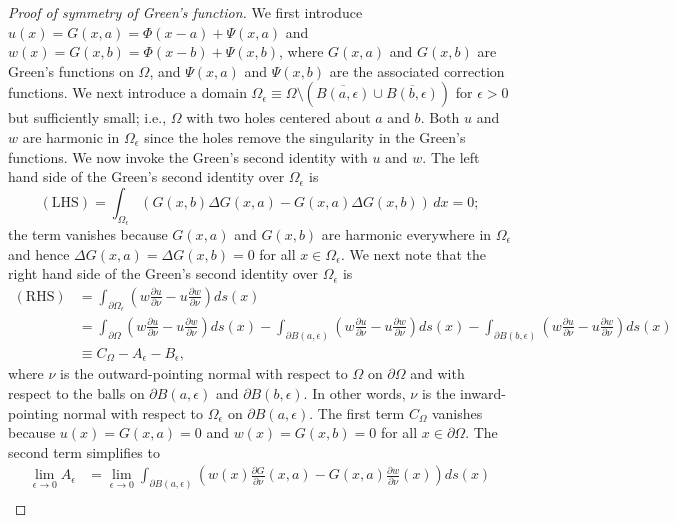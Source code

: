 \begin{proof}[Proof of symmetry of Green's function]
    We first introduce $u(x) = G(x, a) = \Phi(x - a) + \Psi(x, a)$ and $w(x) = G(x, b) = \Phi(x - b) + \Psi(x, b)$, where $G(x, a)$ and $G(x, b)$ are Green's functions on $\Omega$, and $\Psi(x, a)$ and $\Psi(x, b)$ are the associated correction functions. We next introduce a domain $\Omega_\epsilon \equiv \Omega \setminus (\overline{B(a, \epsilon)} \cup \overline{B(b, \epsilon)})$ for $\epsilon > 0$ but sufficiently small; i.e., $\Omega$ with two holes centered about $a$ and $b$. Both $u$ and $w$ are harmonic in $\Omega_\epsilon$ since the holes remove the singularity in the Green's functions. We now invoke the Green's second identity with $u$ and $w$. The left hand side of the Green's second identity over $\Omega_\epsilon$ is
    \[(\text{LHS}) = \int_{\Omega_\epsilon} (G(x, b)\Delta G(x, a) - G(x, a)\Delta G(x, b))\,dx = 0;\]
    the term vanishes because $G(x, a)$ and $G(x, b)$ are harmonic everywhere in $\Omega_\epsilon$ and hence $\Delta G(x, a) = \Delta G(x, b) = 0$ for all $x \in \Omega_\epsilon$. We next note that the right hand side of the Green's second identity over $\Omega_\epsilon$ is
    \begin{align*}
        (\text{RHS}) &= \int_{\partial\Omega_\epsilon} \left(w\frac{\partial u}{\partial\nu} - u\frac{\partial w}{\partial\nu}\right) ds(x) \\
        &= \int_{\partial\Omega} \left(w\frac{\partial u}{\partial\nu} - u\frac{\partial w}{\partial\nu}\right) ds(x) - \int_{\partial B(a, \epsilon)} \left(w\frac{\partial u}{\partial\nu} - u\frac{\partial w}{\partial\nu}\right) ds(x) - \int_{\partial B(b, \epsilon)} \left(w\frac{\partial u}{\partial\nu} - u\frac{\partial w}{\partial\nu}\right) ds(x) \\
        &\equiv C_\Omega - A_\epsilon - B_\epsilon,
    \end{align*}
    where $\nu$ is the outward-pointing normal with respect to $\Omega$ on $\partial\Omega$ and with respect to the balls on $\partial B(a, \epsilon)$ and $\partial B(b, \epsilon)$. In other words, $\nu$ is the inward-pointing normal with respect to $\Omega_\epsilon$ on $\partial B(a, \epsilon)$. The first term $C_\Omega$ vanishes because $u(x) = G(x, a) = 0$ and $w(x) = G(x, b) = 0$ for all $x \in \partial\Omega$. The second term simplifies to
    \begin{align*}
        \lim_{\epsilon \to 0} A_\epsilon &= \lim_{\epsilon \to 0} \int_{\partial B(a, \epsilon)} \left(w(x)\frac{\partial G}{\partial\nu}(x, a) - G(x, a)\frac{\partial w}{\partial\nu}(x)\right) ds(x) \\

\end{align*}
\end{proof}
